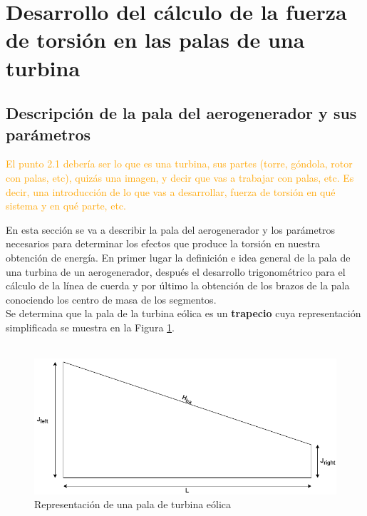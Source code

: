 \section{ Desarrollo del cálculo de la fuerza de torsión en las palas de una turbina}
\label{section:2_desarollo_cálculo}
\subsection{Descripción de la pala del aerogenerador y sus parámetros}

\textcolor{orange}{\huge El punto 2.1 debería ser lo que es una turbina, sus partes (torre, góndola, rotor con palas, etc), quizás una imagen, y decir que vas a trabajar con palas, etc. Es decir, una introducción de lo que vas a desarrollar, fuerza de torsión en qué sistema y en qué parte, etc.}

En esta sección se va a describir la pala del aerogenerador y los parámetros necesarios para determinar los efectos que produce la torsión en nuestra obtención de energía. En primer lugar la definición e idea general de la pala de una turbina de un aerogenerador, después el desarrollo trigonométrico para el cálculo de la línea de cuerda y por último la obtención de los brazos de la pala conociendo los centro de masa de los segmentos.\\


Se determina que la pala de la turbina eólica es un \textbf{trapecio} cuya representación simplificada se muestra en la Figura \ref{fig:pala_simp}. \\\\

\begin{figure}[H]
    \centering
    \includegraphics[width=1\textwidth]{images/pala simple.drawio.png}
    \caption{Representación de una pala de turbina eólica}
    \label{fig:pala_simp}
\end{figure}


